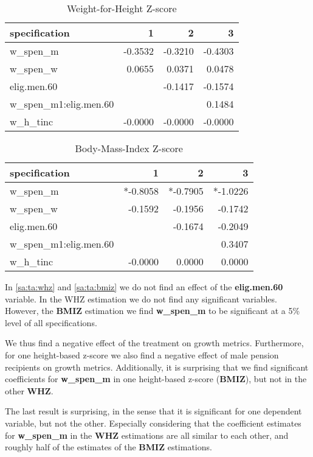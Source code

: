 \begin{refsection}
\begin{table}[!ht]
\centering
\caption{Weight-for-Height Z-score}
\label{sa:ta:whz}
\begin{tabular}{l|rrr}
\hline
specification & 1 & 2 & 3 \\
\hline
w\_spen\_m &  -0.3532 & -0.3210 & -0.4303 \\
w\_spen\_w & 0.0655 & 0.0371 & 0.0478 \\
elig.men.60 & & -0.1417 & -0.1574 \\
w\_spen\_m1:elig.men.60 & & & 0.1484 \\
w\_h\_tinc & -0.0000 & -0.0000 & -0.0000 \\
\end{tabular}
\end{table}

\begin{table}[!ht]
\centering
\caption{Body-Mass-Index Z-score}
\label{sa:ta:bmiz}
\begin{tabular}{l|rrr}
\hline
specification & 1 & 2 & 3 \\
\hline
w\_spen\_m & *-0.8058 & *-0.7905 & *-1.0226 \\
w\_spen\_w & -0.1592 & -0.1956 & -0.1742 \\
elig.men.60 & & -0.1674 & -0.2049 \\
w\_spen\_m1:elig.men.60 & & & 0.3407 \\
w\_h\_tinc & -0.0000 & 0.0000 & 0.0000\\
\end{tabular}
\end{table}


In \autoref{sa:ta:whz} and \autoref{sa:ta:bmiz} we do not find an effect of the \textbf{elig.men.60} variable.
In the WHZ estimation we do not find any significant variables.
However, the \textbf{BMIZ} estimation we find \textbf{w\_spen\_m} to be significant at a 5\% level of all specifications.

We thus find a negative effect of the treatment on growth metrics.
Furthermore, for one height-based z-score we also find a negative effect of male pension recipients on growth metrics.
Additionally, it is surprising that we find significant coefficients for \textbf{w\_spen\_m} in one height-based z-score (\textbf{BMIZ}), but not in the other \textbf{WHZ}.

The last result is surprising, in the sense that it is significant for one dependent variable, but not the other.
Especially considering that the coefficient estimates for \textbf{w\_spen\_m} in the \textbf{WHZ} estimations are all similar to each other,
and roughly half of the estimates of the \textbf{BMIZ} estimations.


\end{refsection}
